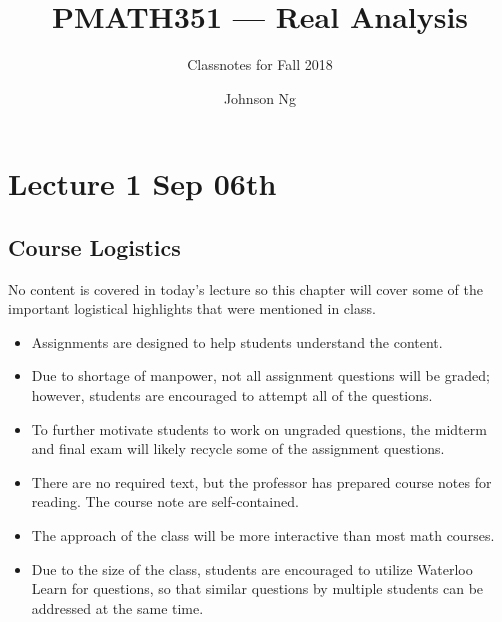 \documentclass[notoc,notitlepage]{tufte-book}
\title{PMATH351 --- Real Analysis}
\author{Johnson Ng}
\subtitle{Classnotes for Fall 2018}
\begin{document}
\hypersetup{pageanchor=false}
\maketitle
\hypersetup{pageanchor=true}
\begin{fullwidth}
\tableofcontents
\end{fullwidth}

\newpage
\begin{fullwidth}
  \renewcommand{\listtheoremname}{\faBook\ \slshape List of Definitions}
  \listoftheorems[ignoreall,show={defn}]
\end{fullwidth}

\newpage 
\begin{fullwidth}
  \renewcommand{\listtheoremname}{\faCoffee\ \slshape List of Theorems}
  \listoftheorems[ignoreall,show={axiom,lemma,thm,crly,propo}]
\end{fullwidth}

\nocite{bforres2018}

\chapter{Lecture 1 Sep 06th}%
\label{chp:lecture_1_sep_06th}

\section{Course Logistics}%
\label{sec:course_logistics}

No content is covered in today's lecture so this chapter will cover some of the important logistical highlights that were mentioned in class.

\begin{itemize}
  \item Assignments are designed to help students understand the content.
  \item Due to shortage of manpower, not all assignment questions will be graded; however, students are encouraged to attempt all of the questions.
  \item To further motivate students to work on ungraded questions, the midterm and final exam will likely recycle some of the assignment questions.
  \item There are no required text, but the professor has prepared course notes for reading. The course note are self-contained.
  \item The approach of the class will be more interactive than most math courses.
  \item Due to the size of the class, students are encouraged to utilize Waterloo Learn for questions, so that similar questions by multiple students can be addressed at the same time.
\end{itemize}
\end{document}
